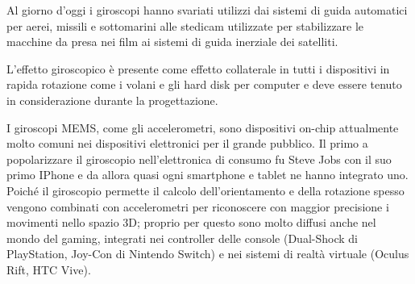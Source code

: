 Al giorno d'oggi i giroscopi hanno svariati utilizzi dai sistemi di guida automatici per aerei, missili e sottomarini alle stedicam utilizzate per stabilizzare le macchine da presa nei film ai sistemi di guida inerziale dei satelliti.

L'effetto giroscopico è presente come effetto collaterale in tutti i dispositivi in rapida rotazione come i volani e gli hard disk per computer e deve essere tenuto in considerazione durante la progettazione.

I giroscopi MEMS, come gli accelerometri, sono dispositivi on-chip attualmente molto comuni nei dispositivi elettronici per il grande pubblico. Il primo a popolarizzare il giroscopio nell'elettronica di consumo fu Steve Jobs con il suo primo IPhone e da allora quasi ogni smartphone e tablet ne hanno integrato uno. Poiché il giroscopio permette il calcolo dell'orientamento e della rotazione spesso vengono combinati con accelerometri per riconoscere con maggior precisione i movimenti nello spazio 3D; proprio per questo sono molto diffusi anche nel mondo del gaming, integrati nei controller delle console (Dual-Shock di PlayStation, Joy-Con di Nintendo Switch) e nei sistemi di realtà virtuale (Oculus Rift, HTC Vive).